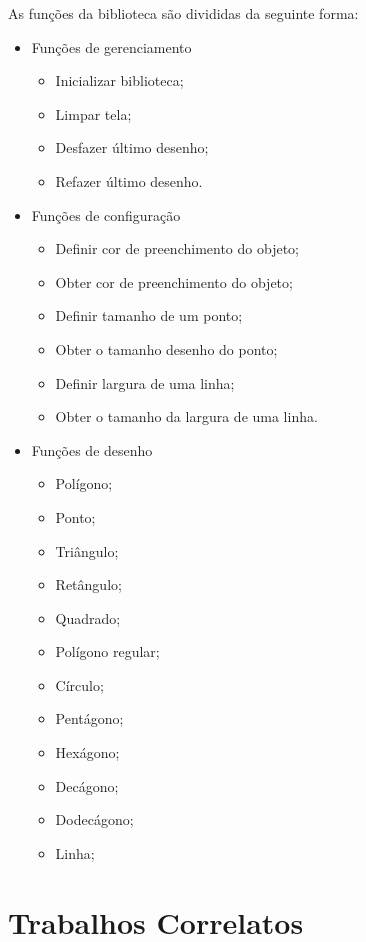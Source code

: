 \documentclass[12pt, %
openright,
oneside, %
a4paper,    %
brazil]{facom-ufu-abntex2}
\begin{document}
As funções da biblioteca são divididas da seguinte forma:
\begin{itemize}

    \item Funções de gerenciamento
    \begin{itemize}
    \item Inicializar biblioteca;
    \item Limpar tela;
    \item Desfazer último desenho;
    \item Refazer último desenho.
    \end{itemize}

    \item Funções de configuração
    \begin{itemize}
    \item Definir cor de preenchimento do objeto;
    \item Obter cor de preenchimento do objeto;
    \item Definir tamanho de um ponto;
    \item Obter o tamanho desenho do ponto;
    \item Definir largura de uma linha;
    \item Obter o tamanho da largura de uma linha.
    \end{itemize}

    \item Funções de desenho
    \begin{itemize}

    \item Polígono;
    \item Ponto;
    \item Triângulo;
    \item Retângulo;
    \item Quadrado;
    \item Polígono regular;
    \item Círculo;
    \item Pentágono;
    \item Hexágono;
    \item Decágono;
    \item Dodecágono;
    \item Linha;

    \end{itemize}
\end{itemize}

\chapter{Trabalhos Correlatos}
\end{document}

